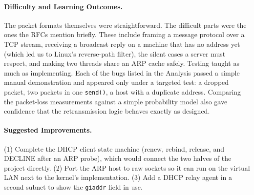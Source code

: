 \documentclass[11pt]{article}
\begin{document}
\paragraph{Difficulty and Learning Outcomes.} The packet formats themselves were
straightforward. The difficult parts were the ones the RFCs mention briefly. These
include framing a message protocol over a TCP stream, receiving a broadcast reply on a
machine that has no address yet (which led us to Linux's reverse-path filter), the silent
cases a server must respect, and making two threads share an ARP cache safely. Testing
taught as much as implementing. Each of the bugs listed in the Analysis passed a simple
manual demonstration and appeared only under a targeted test: a dropped packet, two
packets in one \texttt{send()}, a host with a duplicate address. Comparing the
packet-loss measurements against a simple probability model also gave confidence that
the retransmission logic behaves exactly as designed.

\paragraph{Suggested Improvements.} (1) Complete the DHCP client state machine (renew,
rebind, release, and DECLINE after an ARP probe), which would connect the two halves of
the project directly. (2) Port the ARP host to raw sockets so it can run on the virtual
LAN next to the kernel's implementation. (3) Add a DHCP relay agent in a second subnet to
show the \texttt{giaddr} field in use.
\end{document}
